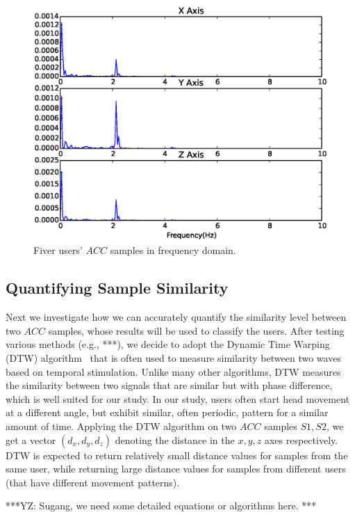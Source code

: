 \begin{figure}[t]
\centering
\includegraphics [width=.95\linewidth]{fig/freq_resp.eps}
\caption{\label{fig:freq_resp}Fiver users' $ACC$ samples in frequency domain.}
\end{figure}

\subsection{Quantifying Sample Similarity}

Next we investigate how we can accurately quantify the similarity level between two $ACC$ samples, whose results will be used to classify the users. After testing various methods (e.g., ***), we decide to adopt the Dynamic Time Warping (DTW) algorithm~\cite{***} that is often used to measure similarity between two waves based on temporal stimulation.  Unlike many other algorithms, DTW measures the similarity between two signals that are similar but with phase difference, which is well suited for our study. In our study, users often start head movement at a different angle, but exhibit similar, often periodic, pattern for a similar amount of time. Applying the DTW algorithm on two $ACC$ samples $S1, S2$, we get a vector $(d_x, d_y, d_z)$ denoting the distance in the $x, y, z$ axes respectively. DTW is expected to return relatively small distance values for samples from the same user, while returning large distance values for samples from different users (that have different movement patterns).

***YZ: Sugang, we need some detailed equations or algorithms here. ***






